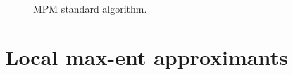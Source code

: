 \begin{figure}\sidecaption
  \centering
  \caption{MPM standard algorithm.}
  \label{fig:MPM_algorithm}
\end{figure}

\section{Local max-ent approximants}
\label{sec:local-max-ent}

